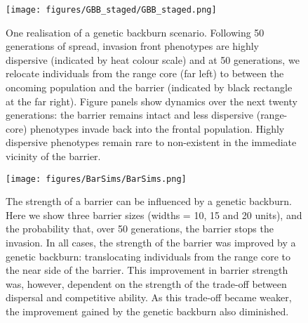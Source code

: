 \documentclass{article}
\begin{document}
\begin{figure}[h!]
\begin{center}
\texttt{[image: figures/GBB\_staged/GBB\_staged.png]}
\caption{\label{fig:stagedsims}
One realisation of a genetic backburn scenario.  Following 50 generations of spread, invasion front phenotypes are highly dispersive (indicated by heat colour scale) and at 50 generations, we relocate individuals from the range core (far left) to between the oncoming population and the barrier (indicated by black rectangle at the far right).  Figure panels show dynamics over the next twenty generations: the barrier remains intact and less dispersive (range-core) phenotypes invade back into the frontal population.  Highly dispersive phenotypes remain rare to non-existent in the immediate vicinity of the barrier.%
}
\end{center}
\end{figure}

\begin{figure}[h!]
\begin{center}
\texttt{[image: figures/BarSims/BarSims.png]}
\caption{\label{fig:barsims}
The strength of a barrier can be influenced by a genetic backburn.  Here we show three barrier sizes (widths = 10, 15 and 20 units), and the probability that, over 50 generations, the barrier stops the invasion.  In all cases, the strength of the barrier was improved by a genetic backburn: translocating individuals from the range core to the near side of the barrier.  This improvement in barrier strength was, however, dependent on the strength of the trade-off between dispersal and competitive ability.  As this trade-off became weaker, the improvement gained by the genetic backburn also diminished.}
\end{center}
\end{figure}


    
  
\end{document}
